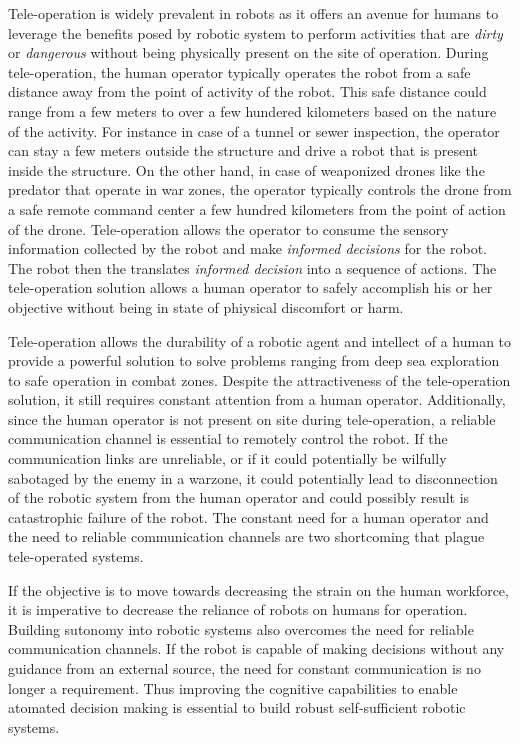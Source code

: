 \documentclass {udthesis}
\begin{document}
Tele-operation is widely prevalent in robots as it offers an avenue for humans to leverage the benefits posed by robotic system to perform activities 
that are \emph{dirty} or \emph{dangerous} without being physically present on the site of operation. During tele-operation, the human operator 
typically operates the robot from a safe distance away from the point of activity of the robot. This safe distance could range from a few meters to over a few hundered kilometers based on the nature of the activity. For instance in case of a tunnel or sewer inspection, the operator can stay a few meters outside the structure and drive a robot that is present inside the structure. On the other hand, in case of weaponized drones like the predator \cite{predator} that operate in war zones, the operator typically controls the drone from a safe remote command center a few hundred kilometers from the point of action of the drone. Tele-operation allows the operator to consume the sensory information collected by the robot and make \emph{informed decisions} for the robot. The robot then the translates \emph{informed decision} into a sequence of actions. The tele-operation solution allows a human operator to safely accomplish his or her objective 
without being in state of phiysical discomfort or harm. 

Tele-operation allows the durability of a robotic agent and intellect of a human to provide a powerful solution to solve problems ranging from deep sea exploration to safe operation in combat zones. Despite the attractiveness of the tele-operation solution, it still requires constant attention from
a human operator. Additionally, since the human operator is not present on site during tele-operation, a reliable communication channel is essential to remotely control the robot. If the communication links are unreliable, or if it could potentially be wilfully sabotaged by the enemy in a warzone, it could potentially lead to disconnection of the robotic system from the human operator and could possibly result is catastrophic failure of the robot. The constant need for a human operator and the need to reliable communication channels are two shortcoming that plague tele-operated systems.

If the objective is to move towards decreasing the strain on the human workforce, it is imperative to decrease the reliance of robots on humans for operation. Building sutonomy into robotic systems also overcomes the need for reliable communication channels. If the robot is capable of making decisions without any guidance from an external source, the need for constant communication is no longer a requirement.
Thus improving the cognitive capabilities to enable atomated decision making is essential to build robust self-sufficient robotic systems.
\end{document}
